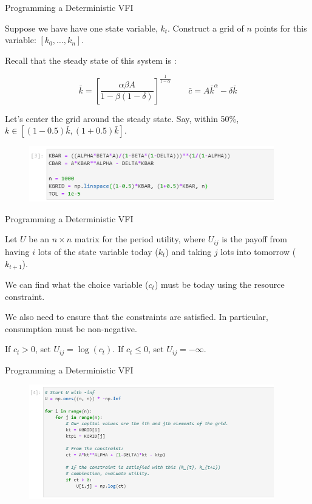 \documentclass[11pt, xcolor={dvipsnames}, hyperref={colorlinks, allcolors=Blue}]{beamer}
\begin{document}
\begin{frame}{Programming a Deterministic VFI}

Suppose we have have one state variable, $k_{t}$. Construct a grid of $n$ points for this variable: $[k_{0}, \dots, k_{n}]$. \bigskip

Recall that the steady state of this system is :

\[\bar{k} = \left [ \frac{\alpha\beta A}{1 - \beta(1-\delta)}  \right]^{\frac{1}{1-\alpha}} \qquad \bar{c} = A\bar{k}^{\alpha} - \delta \bar{k}\]
\bigskip

Let's center the grid around the steady state. Say, within 50\%, $k \in [(1-0.5)\bar{k}, (1+0.5)\bar{k}]$.

\begin{figure}
	\includegraphics[width=0.95\textwidth]{Code2.png}
\end{figure}

\end{frame}

\begin{frame}{Programming a Deterministic VFI}

Let $U$ be an $n\times n$ matrix for the period utility, where $U_{ij}$ is the payoff from having $i$ lots of the state variable today ($k_{t}$) and taking $j$ lots into tomorrow ($k_{t+1}$). \bigskip

We can find what the choice variable ($c_{t}$) must be today using the resource constraint.\bigskip

We also need to ensure that the constraints are satisfied. In particular, consumption must be non-negative. \bigskip

If $c_{t} > 0$, set $U_{ij} = \log(c_{t})$. If $c_{t} \leq 0$, set $U_{ij} = -\infty$.

\end{frame}

\begin{frame}{Programming a Deterministic VFI}
\begin{figure}
	\includegraphics[width=0.95\textwidth]{Code3.png}
	\hfill
\end{figure}
\end{frame}
\end{document}
